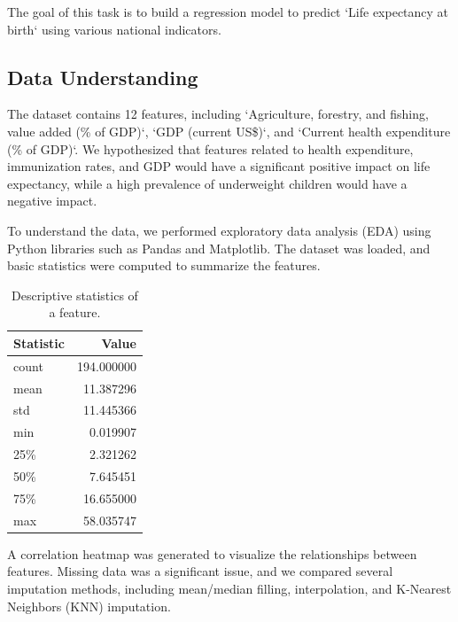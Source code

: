 \documentclass{article}
\begin{document}
The goal of this task is to build a regression model to predict `Life expectancy at birth` using various national indicators.
\subsection{Data Understanding}
\label{ssec:data_understanding}

The dataset contains 12 features, including `Agriculture, forestry, and fishing, value added (\% of GDP)`, `GDP (current US\$)`, and `Current health expenditure (\% of GDP)`. We hypothesized that features related to health expenditure, immunization rates, and GDP would have a significant positive impact on life expectancy, while a high prevalence of underweight children would have a negative impact.

To understand the data, we performed exploratory data analysis (EDA) using Python libraries such as Pandas and Matplotlib. The dataset was loaded, and basic statistics were computed to summarize the features.
\begin{table}[h]
    \centering
    \begin{tabular}{|l|r|}
        \hline
        \textbf{Statistic} & \textbf{Value} \\
        \hline
        count & 194.000000 \\
        mean & 11.387296 \\
        std & 11.445366 \\
        min & 0.019907 \\
        25\% & 2.321262 \\
        50\% & 7.645451 \\
        75\% & 16.655000 \\
        max & 58.035747 \\
        \hline
    \end{tabular}
    \caption{Descriptive statistics of a feature.}
    \label{tab:desc_stats}
\end{table}

A correlation heatmap was generated to visualize the relationships between features. Missing data 
was a significant issue, and we compared several imputation methods, including mean/median filling, 
interpolation, and K-Nearest Neighbors (KNN) \cite{Cover1967} imputation.
\end{document}
